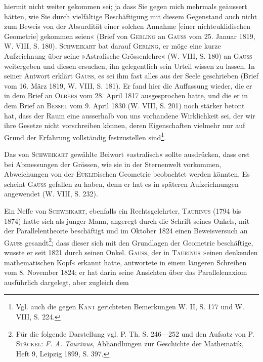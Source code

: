 hiermit nicht weiter gekommen sei; ja dass Sie gegen mich mehrmals geäussert
hätten, wie Sie durch vielfältige Beschäftigung mit diesem Gegenstand
auch nicht zum Beweis von der Absurdität einer solchen Annahme [einer
nichteuklidischen Geometrie] gekommen seien« (Brief von \textsc{Gerling} an \textsc{Gauss}
vom 25. Januar 1819, W. VIII, S. 180). \textsc{Schweikart} bat darauf \textsc{Gerling}, er
möge eine kurze Aufzeichnung über seine »Astralische Grössenlehre« (W. VIII,
S. 180) an \textsc{Gauss} weitergeben und diesen ersuchen, ihn gelegentlich sein Urteil
wissen zu lassen. In seiner Antwort erklärt \textsc{Gauss}, es sei ihm fast alles
aus der Seele geschrieben (Brief vom 16. März 1819, W. VIII, S. 181). Er
fand hier die Auffassung wieder, die er in dem Brief an \textsc{Olbers} vom 28. April
1817 ausgesprochen hatte, und die er in dem Brief an \textsc{Bessel} vom 9. April
1830 (W. VIII, S. 201) noch stärker betont hat, dass der Raum eine ausserhalb
von uns vorhandene Wirklichkeit sei, der wir ihre Gesetze nicht 
vorschreiben können, deren Eigenschaften vielmehr nur auf Grund
der Erfahrung vollständig festzustellen sind\footnote{Vgl. auch die gegen \textsc{Kant} gerichteten Bemerkungen W. II, S. 177 und W. VIII, S. 224.}.
\par
Das von \textsc{Schweikart} gewählte Beiwort »astralisch« sollte ausdrücken, dass
erst bei Abmessungen der Grössen, wie sie in der Sternenwelt vorkommen,
Abweichungen von der \textsc{Euklid}ischen Geometrie beobachtet werden könnten.
Es scheint \textsc{Gauss} gefallen zu haben, denn er hat es in späteren Aufzeichnungen
angewendet (W. VIII, S. 232).
\par
Ein Neffe von \textsc{Schweikart}, ebenfalls ein Rechtsgelehrter, \textsc{Taurinus} (1794
bis 1874) hatte sich als junger Mann, angeregt durch die Schrift seines Onkels,
mit der Parallelentheorie beschäftigt und im Oktober 1824 einen Beweisversuch
an \textsc{Gauss} gesandt\footnote{Für die folgende Darstellung vgl. P. Th. S. 246—252 und den Aufsatz von P. \textsc{Stäckel}: \textit{F. A. Taurinus}, Abhandlungen zur Geschichte der Mathematik, Heft 9, Leipzig 1899, S. 397.}; dass dieser sich mit den Grundlagen der Geometrie
beschäftige, wusste er seit 1821 durch seinen Onkel. \textsc{Gauss}, der in
\textsc{Taurinus} »einen denkenden mathematischen Kopf« erkannt hatte, antwortete
in einem längeren Schreiben vom 8. November 1824; er hat darin seine Ansichten
über das Parallelenaxiom ausführlich dargelegt, aber zugleich dem
\clearpage{}\setcounter{footnote}{0}
